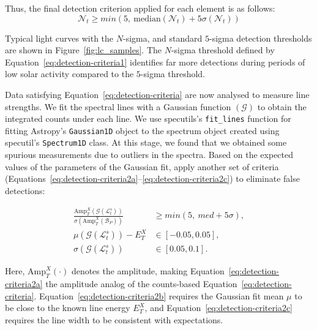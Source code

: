 \documentclass[twocolumn,linenumbers]{aastex631}
\newcommand{\revone}[1]{#1}
\begin{document}
Thus, the final detection criterion applied for each element is as follows:
\begin{equation}
   \mathcal{N}_t \geq min \left(5,~\text{median}(\mathcal{N}_t) + 5 \sigma(\mathcal{N}_t) \right)
    \label{eq:detection-criteria}
\end{equation}

\revone{Typical light curves with the $N$-sigma, and standard $5$-sigma detection thresholds are shown in Figure~\ref{fig:lc_samples}. The $N$-sigma threshold defined by Equation~\ref{eq:detection-criteria1} identifies far more detections during periods of low solar activity compared to the $5$-sigma threshold.}

Data satisfying Equation~\ref{eq:detection-criteria} are now analysed to measure line strengths.
We fit the spectral lines with a Gaussian function $(\mathcal{G})$ to obtain the integrated counts under each line. 
We use specutils's \texttt{fit\_lines} function for fitting Astropy's \texttt{Gaussian1D} object to the spectrum object created using specutil's \texttt{Spectrum1D} class. At this stage, we found that we obtained some spurious measurements due to outliers in the spectra. Based on the expected values of the parameters of the Gaussian fit, apply another set of criteria (Equations~\ref{eq:detection-criteria2a}--\ref{eq:detection-criteria2c}) to eliminate false detections:

\begin{align}
    \frac{\text{Amp}_T^X\left(\mathcal{G}\left(\mathcal{L}_t^s\right)\right)}{\sigma \left(\text{Amp}_T^X\left(\mathcal{B}_P\right)\right)} & \ge min (5,~med + 5 \sigma) , \label{eq:detection-criteria2a} \\
    \mu\left(\mathcal{G}\left(\mathcal{L}_t^s\right)\right) - E^{X}_T & \in [-0.05, 0.05], \label{eq:detection-criteria2b}\\ 
    \sigma\left(\mathcal{G}\left(\mathcal{L}_t^s\right)\right) & \in [0.05, 0.1]. \label{eq:detection-criteria2c}
\end{align}

Here, $\text{Amp}_T^X\left(\cdot\right)$ denotes the amplitude, making Equation~\ref{eq:detection-criteria2a} the amplitude analog of the counts-based Equation~\ref{eq:detection-criteria}. Equation~\ref{eq:detection-criteria2b} requires the Gaussian fit mean $\mu$ to be close to the known line energy $E_T^X$, and Equation~\ref{eq:detection-criteria2c} requires the line width to be consistent with expectations.
\end{document}
